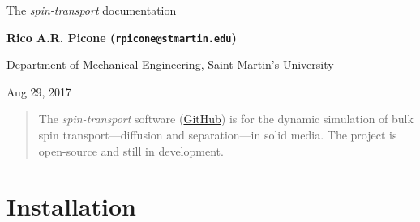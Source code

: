 \documentclass[%
oneside,                 %
final,                   %
10pt]{article}
\begin{document}

\newcommand{\exercisesection}[1]{\subsection*{#1}}






\thispagestyle{empty}

\begin{center}
{\LARGE\bf
\begin{spacing}{1.25}
The \emph{spin-transport} documentation
\end{spacing}
}
\end{center}


\begin{center}
{\bf Rico A.R. Picone (\texttt{rpicone@stmartin.edu})}
\end{center}

    \begin{center}
\centerline{{\small Department of Mechanical Engineering, Saint Martin's University}}
\end{center}
    

\begin{center}
Aug 29, 2017
\end{center}

\vspace{1cm}

\begin{abstract}
The \emph{spin-transport} software (\href{{https://github.com/ricopicone/spin-transport}}{GitHub}) is for the dynamic simulation of bulk spin transport---diffusion and separation---in solid media.
The project is open-source and still in development.
\end{abstract}

\tableofcontents


\vspace{1cm} %





\section{Installation}
\label{section:installation}
\end{document}
